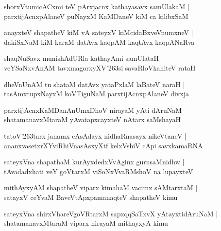 \setcounter{shloka}{0}
\begin{shloka}
shorxVtumicACxmi teV pArxjacnx kathayasavx samUlakaM |\\
parxtijAcnxpAlaneV puNayxM KaMDaneV kiM ca kilibxSaM
\end{shloka}

\begin{shloka}
anayxteV shapatheV kiM vA sateyxV kiMcidaBxveVnumxneV |\\
dakiSxNaM kiM karaM datAvx kaqpAM kaqtAvx kaqpANaRva
\end{shloka}

\begin{shloka}
shaqNuSavx munishAdURla kathayAmi samUlataH |\\
veYSaNxvAnAM tavxmagorxyXV\char'263si savaRloVkahiteV rataH
\end{shloka}

\begin{shloka}
dheVnUnAM tu shataM datAvx yataPxlaM laBateV naraH |\\
tasAmxtupxNayxM koVTiguNaM parxtijAcnxpAlaneV divxja
\end{shloka}

\begin{shloka}
parxtijAcnxKaMDanAnUmxDhoV nirayaM yAti dAruNaM\\
shatamanavxMtaraM yAvatapxcayxteV nAtarx saMshayaH
\end{shloka}

\begin{shloka}
tatoV\char'263tarx janamx cAsAdayx nidhaRnasayx nikeVtaneV |\\
ananxvasetxrXYviRhiVnasAsxyXtf kelxVshiV cApi savxkamaRNA
\end{shloka}

\begin{shloka}
sateyxVna shapathaM kurAyxdedxVvAginx gurusaMnidhw |\\
tAvadadxhati veY goVtarxM viSoNxVvaRMshoV na lupayxteV 
\end{shloka}

\begin{shloka}
mithAyxyAM shapatheV viparx kimahaM vacimx sAMtarxtaM |\\
satayxV ceYvaM BaveVtApxpamanaqteV shapatheV kimu
\end{shloka}

\begin{shloka}
sateyxVna shirxVhareVgoVRtarxM sapxqqSaTxvX yAtayxtidAruNaM |\\
shatamanavxMtaraM viparx nirayaM mithayxyA kimu
\end{shloka}

